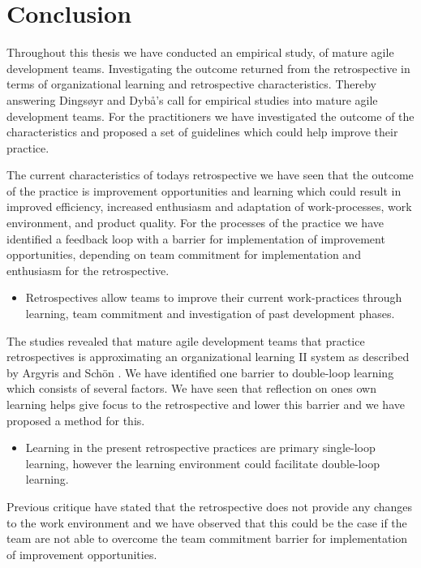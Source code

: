 \section{Conclusion}
Throughout this thesis we have conducted an empirical study, of mature agile development teams. Investigating the outcome returned from the retrospective in terms of organizational learning and retrospective characteristics. Thereby answering Dingsøyr and Dybå’s call \cite{Dyba2008} for empirical studies into mature agile development teams. For the practitioners we have investigated the outcome of the characteristics and proposed a set of guidelines which could help improve their practice.

The current characteristics of todays retrospective we have seen that the outcome of the practice is improvement opportunities and learning which could result in improved efficiency, increased enthusiasm and adaptation of work-processes, work environment, and product quality. For the processes of the practice we have identified a feedback loop with a barrier for implementation of improvement opportunities, depending on team commitment for implementation and enthusiasm for the retrospective. 

\begin{itemize}
\item Retrospectives allow teams to improve their current work-practices through learning, team commitment and investigation of past development phases.
\end{itemize}

The studies revealed that mature agile development teams that practice retrospectives is approximating an organizational learning II system as described by Argyris and Schön \cite{Argyris1996}. We have identified one barrier to double-loop learning which consists of several factors. We have seen that reflection on ones own learning helps give focus to the retrospective and lower this barrier and we have proposed a method for this. 

\begin{itemize}
\item Learning in the present retrospective practices are primary single-loop learning, however the learning environment could facilitate double-loop learning.
\end{itemize}

Previous critique \cite{Drury2012} have stated that the retrospective does not provide any changes to the work environment and we have observed that this could be the case if the team are not able to overcome the team commitment barrier for implementation of improvement opportunities.  

